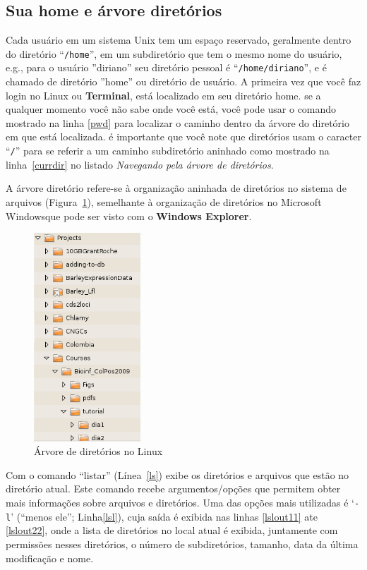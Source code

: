 \documentclass[letter,11pt]{book}
\begin{document}
\subsection{Sua home e árvore diretórios\label{homedir}}

Cada usuário em um sistema Unix tem um espaço reservado, geralmente dentro do diretório ``\Verb+/home+'', em um subdiretório que tem o mesmo nome do usuário, e.g., para o usuário ''diriano'' seu diretório pessoal é ``\Verb+/home/diriano+'', e é chamado de diretório ''home'' ou diretório de usuário.  A primeira vez que você faz login no Linux ou \textbf{Terminal}, está localizado em seu diretório home. se a qualquer momento você não sabe onde você está, você pode usar o comando mostrado na linha \ref{pwd} para localizar o caminho dentro da árvore do diretório em que está localizada. é importante que você note que diretórios usam o caracter ``\Verb+/+'' para se referir a um caminho subdiretório aninhado como mostrado na linha~\ref{currdir} no listado \textit{Navegando pela árvore de diretórios}.

A árvore diretório refere-se à organização aninhada de diretórios no sistema de arquivos (Figura~\ref{arboldir}), semelhante à organização de diretórios no Microsoft Windows\texttrademark que pode ser visto com o \textbf{Windows Explorer}.

\begin{figure}[ht]
\centering
   \includegraphics[width=4cm]{Figs/arboldir.png}
  \caption{\label{arboldir}Árvore de diretórios no Linux}
\end{figure}

Com o comando ``listar'' (Línea~\ref{ls}) exibe os diretórios e arquivos que estão no diretório atual. Este comando recebe argumentos/opções que permitem obter mais informações sobre arquivos e diretórios. Uma das opções mais utilizadas é `\Verb+-l+' (``menos ele''; Linha\ref{lsl}), cuja saída é exibida nas linhas \ref{lslout11} ate \ref{lslout22}, onde a lista de diretórios no local atual é exibida, juntamente com permissões nesses diretórios, o número de subdiretórios, tamanho, data da última modificação e nome.
\end{document}
